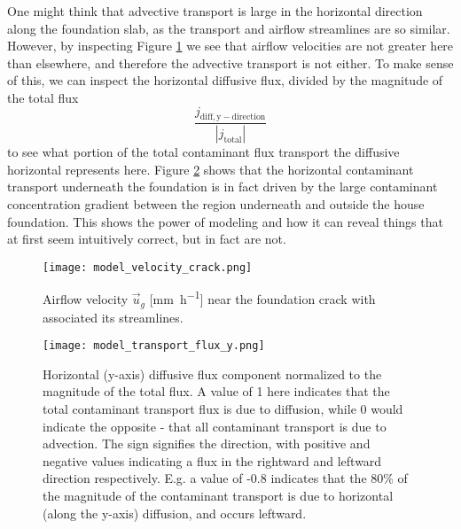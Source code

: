 One might think that advective transport is large in the horizontal direction along the foundation slab, as the transport and airflow streamlines are so similar.
However, by inspecting Figure \ref{fig:model_velocity_crack} we see that airflow velocities are not greater here than elsewhere, and therefore the advective transport is not either.
To make sense of this, we can inspect the horizontal diffusive flux, divided by the magnitude of the total flux
\begin{equation}
  \frac{j_\mathrm{diff,y-direction}}{|j_\mathrm{total}|}
\end{equation}
to see what portion of the total contaminant flux transport the diffusive horizontal represents here.
Figure \ref{fig:model_horizontal_diff} shows that the horizontal contaminant transport underneath the foundation is in fact driven by the large contaminant concentration gradient between the region underneath and outside the house foundation.
This shows the power of modeling and how it can reveal things that at first seem intuitively correct, but in fact are not.\par

\begin{figure}[htb!]
  \centering
  \texttt{[image: model\_velocity\_crack.png]}
  \caption{Airflow velocity $\vec{u}_g$ [\si{\milli\metre\per\hour}] near the foundation crack with associated its streamlines.}
  \label{fig:model_velocity_crack}
\end{figure}

\begin{figure}[htb!]
  \centering
  \texttt{[image: model\_transport\_flux\_y.png]}
  \caption[Analysis of horizontal diffusion flux.]{Horizontal (y-axis) diffusive flux component normalized to the magnitude of the total flux. A value of 1 here indicates that the total contaminant transport flux is due to diffusion, while 0 would indicate the opposite - that all contaminant transport is due to advection. The sign signifies the direction, with positive and negative values indicating a flux in the rightward and leftward direction respectively. E.g. a value of -0.8 indicates that the 80\% of the magnitude of the contaminant transport is due to horizontal (along the y-axis) diffusion, and occurs leftward.}
  \label{fig:model_horizontal_diff}
\end{figure}

